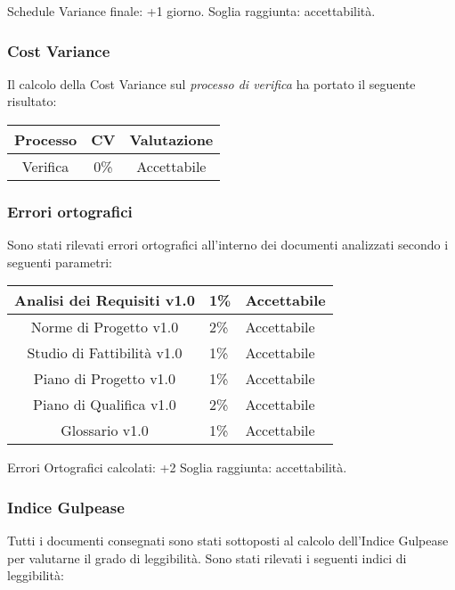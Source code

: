 Schedule Variance finale: +1 giorno.
Soglia raggiunta: accettabilità.

\subsubsection{Cost Variance}
Il calcolo della Cost Variance sul \emph{processo di verifica} ha portato il seguente risultato: 

{
	\renewcommand{\arraystretch}{2}
	\centering
	\begin{tabular}{|c | c | c |}
		\hline
		Processo & CV & Valutazione \\
		\hline
		Verifica & 0\% & Accettabile \\
		\hline
	\end{tabular}

}

\subsubsection{Errori ortografici}
Sono stati rilevati errori ortografici all'interno dei documenti analizzati secondo i seguenti parametri:
{
	\renewcommand{\arraystretch}{2}
	\centering
	\begin{tabular}{| c | C{1cm} | C{3cm} |}
			\hline
		Analisi dei Requisiti v1.0 & 1\% & Accettabile \\
			\hline
		Norme di Progetto v1.0 & 2\% & Accettabile\\
			\hline
		Studio di Fattibilità v1.0 & 1\% &  Accettabile \\
			\hline
		Piano di Progetto v1.0 & 1\% & Accettabile \\
			\hline
		Piano di Qualifica v1.0 & 2\% & Accettabile\\
			\hline
		Glossario v1.0 & 1\% & Accettabile\\
			\hline
	\end{tabular}

}

Errori Ortografici calcolati: +2%
Soglia raggiunta: accettabilità.


\subsubsection{Indice Gulpease}

Tutti i documenti consegnati sono stati sottoposti al calcolo dell'Indice Gulpease per valutarne il grado di leggibilità.
Sono stati rilevati i seguenti indici di leggibilità:

